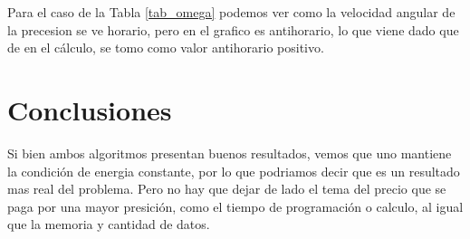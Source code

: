 \documentclass[10pt]{article}
\begin{document}
Para el caso de la Tabla \ref{tab_omega} podemos ver como la velocidad angular de la precesion se ve horario, pero en el grafico es antihorario, lo que viene dado que de en el cálculo, se tomo como valor antihorario positivo. 

\section{Conclusiones}
Si bien ambos algoritmos presentan buenos resultados, vemos que uno mantiene la condición de energia constante, por lo que podriamos decir que es un resultado mas real del problema. Pero no hay que dejar de lado el tema del precio que se paga por una mayor presición, como el tiempo de programación o calculo, al igual que la memoria y cantidad de datos. 
\end{document}
